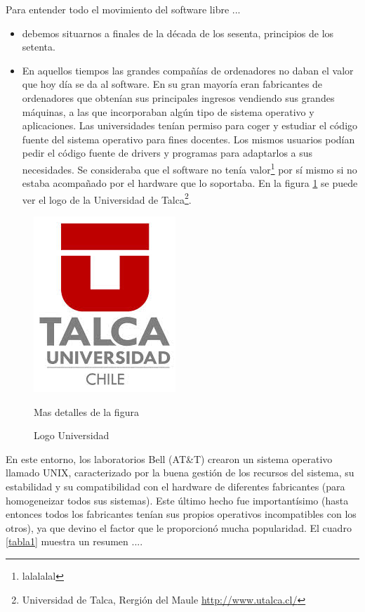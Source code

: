 \documentclass[12pt]{article}
\begin{document}
Para entender todo el movimiento del software libre ...
\begin{itemize}
  \item debemos situarnos a finales de la década de los sesenta, principios de los setenta.
  \item En aquellos tiempos las grandes compañías de ordenadores no daban el valor que hoy día se da al software. En su gran mayoría eran fabricantes de ordenadores que obtenían sus principales ingresos vendiendo sus grandes máquinas, a las que incorporaban algún tipo de sistema operativo y aplicaciones. Las universidades tenían permiso  para coger y estudiar el código fuente del sistema operativo para fines docentes. Los mismos usuarios podían pedir el código fuente de drivers y programas para adaptarlos a sus necesidades. Se consideraba  que el software no tenía valor\footnote{lalalalal} por sí mismo si no estaba acompañado por el hardware que lo soportaba. En la figura \ref{fig1} se puede ver el logo de la Universidad de Talca\footnote{Universidad de Talca, Rergión del Maule \url{http://www.utalca.cl/}}.
\end{itemize}

\begin{figure}[!h]
   \centering
   \includegraphics[scale=.5]{imgs/logo.png}
   \caption{Logo Universidad}{Mas detalles de la figura}
   \label{fig1}
\end{figure}

En este entorno, los laboratorios Bell (AT\&T) crearon un sistema operativo llamado UNIX\cite{unix}, caracterizado por la buena gestión de los recursos del sistema, su estabilidad y su compatibilidad\cite{vbox} con el hardware de diferentes fabricantes (para homogeneizar todos sus sistemas). Este último hecho fue importantísimo (hasta entonces todos los fabricantes tenían sus propios operativos incompatibles con los otros), ya que devino el factor que le proporcionó mucha popularidad. El cuadro \ref{tabla1} muestra un resumen ....
\end{document}
